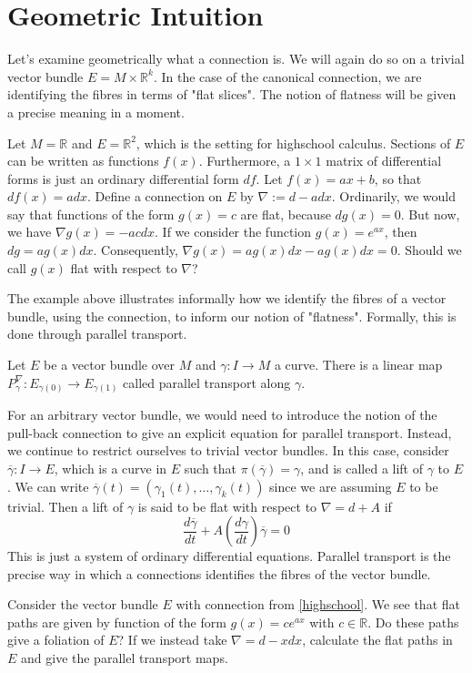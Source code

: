 \section{Geometric Intuition}

Let's examine geometrically what a connection is. We will again do so on a trivial vector bundle $E=M\times\mathbb{R}^k$. In the case of the canonical connection, we are identifying the fibres in terms of "flat slices". The notion of flatness will be given a precise meaning in a moment. 
\begin{example}\label{highschool}
  Let $M=\mathbb{R}$ and $E=\mathbb{R}^2$, which is the setting for highschool calculus. Sections of $E$ can be written as functions $f(x)$. Furthermore, a $1\times 1$ matrix of differential forms is just an ordinary differential form $df$. Let $f(x)=ax+b$, so that $df(x)=adx$. Define a connection on $E$ by $\nabla:=d-adx$. Ordinarily, we would say that functions of the form $g(x)=c$ are flat, because $dg(x)=0$. But now, we have $\nabla g(x)=-acdx$. If we consider the function $g(x)=e^{ax}$, then $dg=ag(x)dx$. Consequently, $\nabla g(x)=ag(x)dx-ag(x)dx=0$. Should we call $g(x)$ flat with respect to $\nabla$?
\end{example}
The example above illustrates informally how we identify the fibres of a vector bundle, using the connection, to inform our notion of "flatness". Formally, this is done through parallel transport.
\begin{definition}
  Let $E$ be a vector bundle over $M$ and $\gamma:I\to M$ a curve. There is a linear map $P^\nabla_\gamma:E_{\gamma(0)}\to E_{\gamma(1)}$ called parallel transport along $\gamma$.
\end{definition}
For an arbitrary vector bundle, we would need to introduce the notion of the pull-back connection to give an explicit equation for parallel transport. Instead, we continue to restrict ourselves to trivial vector bundles. In this case, consider $\overline{\gamma}:I\to E$, which is a curve in $E$ such that $\pi(\overline{\gamma})=\gamma$, and is called a lift of $\gamma$ to $E$. We can write $\overline{\gamma}(t)=(\gamma_1(t),\dots,\gamma_k(t))$ since we are assuming $E$ to be trivial. Then a lift of $\gamma$ is said to be flat with respect to $\nabla=d+A$ if
$$\frac{d\overline{\gamma}}{dt}+A(\frac{d\gamma}{dt})\overline{\gamma}=0$$
This is just a system of ordinary differential equations. Parallel transport is the precise way in which a connections identifies the fibres of the vector bundle.
\begin{exercise}
  Consider the vector bundle $E$ with connection from \ref{highschool}. We see that flat paths are given by function of the form $g(x)=ce^{ax}$ with $c\in\mathbb{R}$. Do these paths give a foliation of $E$? If we instead take $\nabla=d-xdx$, calculate the flat paths in $E$ and give the parallel transport maps.
\end{exercise}

